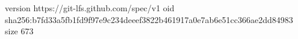 version https://git-lfs.github.com/spec/v1
oid sha256:b7fd33a5fb1fd9f97e9c234deeef3822b461917a0e7ab6e51cc366ae2dd84983
size 673
